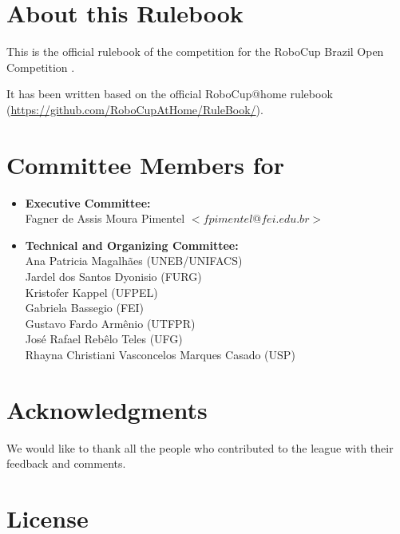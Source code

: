 

\section*{About this Rulebook}  
This is the official rulebook of the \AtHome{} competition for the RoboCup Brazil Open Competition \YEAR.

It has been written based on the official RoboCup@home rulebook (\url{https://github.com/RoboCupAtHome/RuleBook/}). 

\section*{Committee Members for \YEAR}
\begin{itemize}
    \item \textbf{Executive Committee:} \\ Fagner de Assis Moura Pimentel $<fpimentel@fei.edu.br>$
    \item \textbf{Technical and Organizing Committee:} \\ 
        Ana Patricia Magalhães (UNEB/UNIFACS) \\
        Jardel dos Santos Dyonisio (FURG) \\
        Kristofer Kappel (UFPEL) \\
        Gabriela Bassegio (FEI) \\
        Gustavo Fardo Armênio (UTFPR) \\
        José Rafael Rebêlo Teles (UFG) \\
        Rhayna Christiani Vasconcelos Marques Casado (USP)
\end{itemize}

\section*{Acknowledgments}
\label{sec:acknowledgments}

We would like to thank all the people who contributed to the \AtHome{} league with their feedback and comments.

\vfill

\section*{License}

\doclicenseThis

